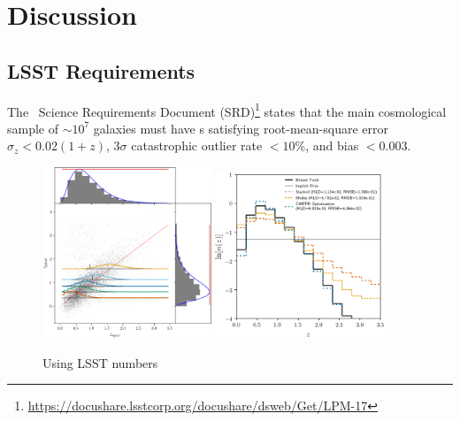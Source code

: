 \section{Discussion}


\subsection{LSST Requirements}

The \lsst\ Science Requirements Document (SRD)\footnote{\url{https://docushare.lsstcorp.org/docushare/dsweb/Get/LPM-17}} states that the main cosmological sample of $\sim 10^{7}$ galaxies must have \pz s satisfying root-mean-square error $\sigma_z < 0.02 (1+z)$, $3 \sigma$ catastrophic outlier rate $< 10\%$, and bias $< 0.003$.

\begin{figure}
	\begin{center}
		\includegraphics[width=0.45\textwidth]{figures/chippr/lsst_scatter.png}
		\includegraphics[width=0.45\textwidth]{figures/chippr/lsst_log_estimators.png}
		\caption{Using LSST numbers}
	\end{center}
\end{figure}

